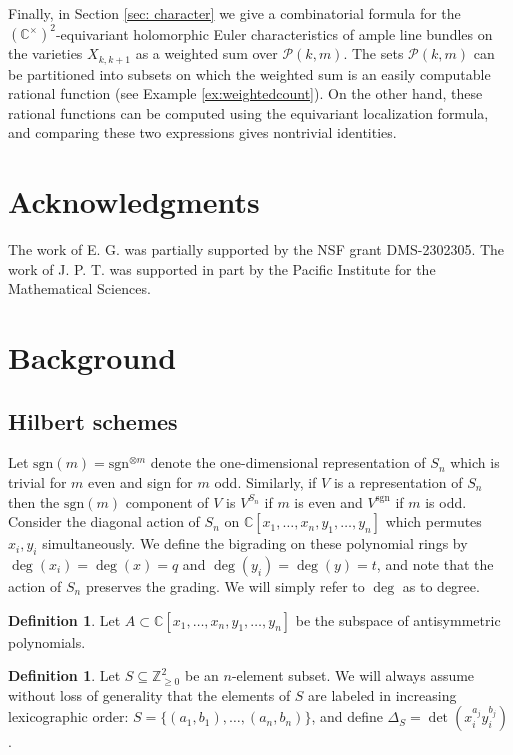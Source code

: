 \documentclass[12pt]{amsart}
\newcommand{\C}{\mathbb{C}}
\newcommand{\Z}{\mathbb{Z}}
\newcommand{\sgn}{\mathrm{sgn}}
\numberwithin{equation}{section}
\theoremstyle{definition}
\newtheorem{definition}[theorem]{Definition}
\begin{document}
Finally, in Section \ref{sec: character} we give a combinatorial formula for the $(\C^{\times})^2$-equivariant holomorphic Euler characteristics of ample line bundles on the varieties $X_{k,k+1}$ as a weighted sum over $\mathcal{P}(k,m)$. The sets $\mathcal{P}(k,m)$ can be partitioned into subsets on which the weighted sum is an easily computable rational function (see Example \ref{ex:weightedcount}). On the other hand, these rational functions can be computed using the equivariant localization formula, and comparing these two expressions gives nontrivial identities. 



\section*{Acknowledgments}

The work of E. G. was partially supported by the NSF grant DMS-2302305. The work of J. P. T. was supported in part by the Pacific Institute for the Mathematical Sciences.


\section{Background}\label{sec:background}

\subsection{Hilbert schemes}

Let $\sgn(m)=\sgn^{\otimes m}$ denote the one-dimensional representation of $S_n$ which is trivial for $m$ even and sign for $m$ odd. Similarly, if $V$ is a representation of $S_n$ then the $\sgn(m)$ component of $V$ is $V^{S_n}$ if $m$ is even and $V^{\sgn}$ if $m$ is odd. Consider the diagonal action of $S_n$ on $\C[x_1,\ldots,x_n,y_1,\ldots,y_n]$ which permutes $x_i, y_i$ simultaneously. We define the bigrading on these polynomial rings by $\deg(x_i)=\deg(x)=q$ and $\deg(y_i)=\deg(y)=t$, and note that the action of $S_n$ preserves the grading. We will simply refer to $\deg$ as to degree.

\begin{definition}
Let $A\subset \C[x_1,\ldots,x_n,y_1,\ldots,y_n]$ be the subspace of antisymmetric polynomials.
\end{definition}

\begin{definition}
\label{def: delta S}
Let $S\subseteq \Z^2_{\ge 0}$ be an $n$-element subset. We will always assume without loss of generality that the elements of $S$ are labeled in increasing lexicographic order: $S=\{(a_1,b_1),\ldots,(a_n,b_n)\}$, and define $\Delta_{S}=\det(x_i^{a_j}y_i^{b_j})$. 
\end{definition}
\end{document}
